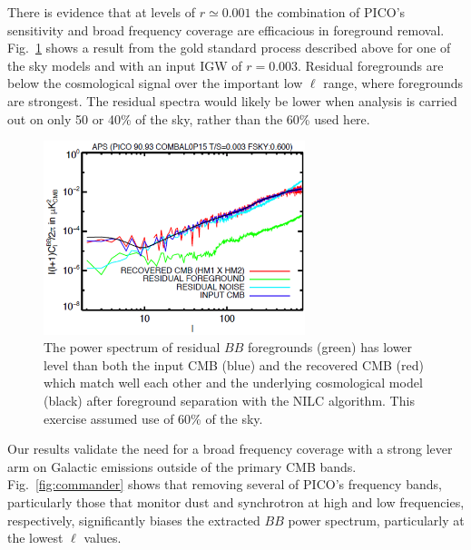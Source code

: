 \documentclass[PICOReport.tex]{subfiles}
\begin{document}
There is evidence that at levels of $r \simeq 0.001$ the combination of PICO's sensitivity and broad frequency coverage are efficacious in foreground removal. Fig.~\ref{fig:nilc} shows a result from the gold standard process described above for one of the sky models and with an input \ac{IGW} of $r=0.003$. Residual foregrounds are below the cosmological signal over the important low $\ell$ range, where foregrounds are strongest. The residual spectra would likely be lower when analysis is carried out on only 50 or 40\% of the sky, rather than the 60\% used here. 

\begin{figure}
\hspace{-0.1in}
\parbox{3.0in}{\centerline {
\includegraphics[width=3.0in]{images/soumen_NILC_foregrounds_93.png}}}
\hspace{0.25in}
\parbox{3.0in}{
\caption{The power spectrum of residual $BB$ foregrounds (green) has lower level than both the input CMB (blue) and the recovered CMB (red) which match well each other and the underlying cosmological model (black) after foreground separation with the NILC algorithm. This exercise assumed use of 60\% of the sky.   
\label{fig:nilc}}}
\vspace{-0.1in}
\end{figure}

Our results validate the need for a broad frequency coverage with a strong lever arm on Galactic emissions outside of the primary CMB bands. Fig.~\ref{fig:commander} shows that removing several of PICO's frequency bands, particularly those that monitor dust and synchrotron at high and low frequencies, respectively, significantly biases the extracted $BB$ power spectrum, particularly at the lowest $\ell$ values. 
\end{document}
